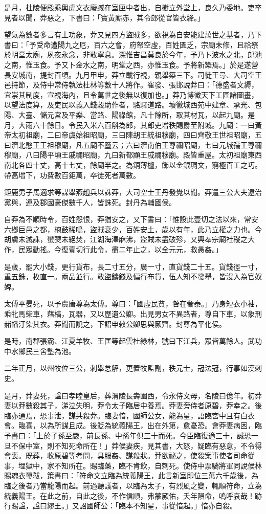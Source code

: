 \begin{pinyinscope}
是月，杜陵便殿乘輿虎文衣廢臧在室匣中者出，自樹立外堂上，良久乃委地。吏卒見者以聞，莽惡之，下書曰：「寶黃廝赤，其令郎從官皆衣絳。」

望氣為數者多言有土功象，莽又見四方盜賊多，欲視為自安能建萬世之基者，乃下書曰：「予受命遭陽九之厄，百六之會，府帑空虛，百姓匱乏，宗廟未修，且祫祭於明堂太廟，夙夜永念，非敢寧息。深惟吉昌莫良於今年，予乃卜波水之北，郎池之南，惟玉食。予又卜金水之南，明堂之西，亦惟玉食。予將新築焉。」於是遂營長安城南，提封百頃。九月甲申，莽立載行視，親舉築三下。司徒王尋、大司空王邑持節，及侍中常侍執法杜林等數十人將作。崔發、張邯說莽曰：「德盛者文縟，宜崇其制度，宣視海內，且令萬世之後無以復加也。」莽乃博徵天下工匠諸圖畫，以望法度算，及吏民以義入錢穀助作者，駱驛道路。壞徹城西苑中建章、承光、包陽、大臺、儲元宮及平樂、當路、陽祿館，凡十餘所，取其材瓦，以起九廟。是月，大雨六十餘日。令民入米六百斛為郎，其郎吏增秩賜爵至附城。九廟：一曰黃帝太初祖廟，二曰帝虞始祖昭廟，三曰陳胡王統祖穆廟，四曰齊敬王世祖昭廟，五曰濟北愍王王祖穆廟，凡五廟不墮云；六曰濟南伯王尊禰昭廟，七曰元城孺王尊禰穆廟，八曰陽平頃王戚禰昭廟，九曰新都顯王戚禰穆廟。殿皆重屋。太初祖廟東西南北各四十丈，高十七丈，餘廟半之。為銅薄櫨，飾以金銀琱文，窮極百工之巧。帶高增下，功費數百鉅萬，卒徒死者萬數。

鉅鹿男子馬適求等謀舉燕趙兵以誅莽，大司空士王丹發覺以聞。莽遣三公大夫逮治黨與，連及郡國豪傑數千人，皆誅死。封丹為輔國侯。

自莽為不順時令，百姓怨恨，莽猶安之，又下書曰：「惟設此壹切之法以來，常安六鄉巨邑之都，枹鼓稀鳴，盜賊衰少，百姓安土，歲以有年，此乃立權之力也。今胡虜未滅誅，蠻僰未絕焚，江湖海澤麻沸，盜賊未盡破殄，又興奉宗廟社稷之大作，民眾動搖。今復壹切行此令，盡二年止之，以全元元，救愚姦。」

是歲，罷大小錢，更行貨布，長二寸五分，廣一寸，直貨錢二十五。貨錢徑一寸，重五銖，枚直一。兩品並行。敢盜鑄錢及偏行布貨，伍人知不發舉，皆沒入為官奴婢。

太傅平晏死，以予虞唐尊為太傅。尊曰：「國虛民貧，咎在奢泰。」乃身短衣小袖，乘牝馬柴車，藉槁，瓦器，又以歷遺公卿。出見男女不異路者，尊自下車，以象刑赭幡汙染其衣。莽聞而說之，下詔申敕公卿思與厥齊。封尊為平化侯。

是時，南郡張霸、江夏羊牧、王匡等起雲杜綠林，號曰下江兵，眾皆萬餘人。武功中水鄉民三舍墊為池。

二年正月，以州牧位三公，刺舉怠解，更置牧監副，秩元士，冠法冠，行事如漢刺史。

是月，莽妻死，諡曰孝睦皇后，葬渭陵長壽園西，令永侍文母，名陵曰億年。初莽妻以莽數殺其子，涕泣失明，莽令太子臨居中養焉。莽妻旁侍者原碧，莽幸之。後臨亦通焉，恐事泄，謀共殺莽。臨妻愔，國師公女，能為星，語臨宮中且有白衣會。臨喜，以為所謀且成。後貶為統義陽王，出在外第，愈憂恐。會莽妻病困，臨予書曰：「上於子孫至嚴，前長孫、中孫年俱三十而死。今臣臨復適三十，誠恐一旦不保中室，則不知死命所在！」莽侯妻疾，見其書，大怒，疑臨有惡意，不令得會喪。既葬，收原碧等考問，具服姦、謀殺狀。莽欲祕之，使殺案事使者司命從事，埋獄中，家不知所在。賜臨藥，臨不肯飲，自刺死。使侍中票騎將軍同說侯林賜魂衣璽韍，策書曰：「符命文立臨為統義陽王，此言新室即位三萬六千歲後，為臨之後者乃當龍陽而起。前過聽議者，以臨為太子，有烈風之變，輒順符命，立為統義陽王。在此之前，自此之後，不作信順，弗蒙厥佑，夭年隕命，嗚呼哀哉！跡行賜諡，諡曰繆王。」又詔國師公：「臨本不知星，事從愔起。」愔亦自殺。


\end{pinyinscope}
